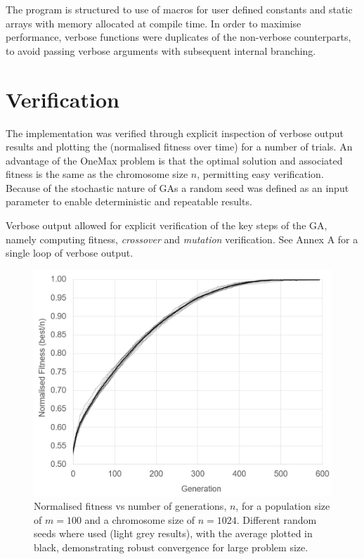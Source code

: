 \documentclass{report}
\begin{document}
The program is structured to use of macros for user defined constants and static arrays with memory allocated at compile time. In order to maximise performance, verbose functions were duplicates of the non-verbose counterparts, to avoid passing verbose arguments with subsequent internal branching. 

\section{Verification}
The implementation was verified through explicit inspection of verbose output results and plotting the (normalised fitness over time) for a number of trials. An advantage of the OneMax problem is that the optimal solution and associated fitness is the same as the chromosome size \(n\), permitting easy verification.  Because of the stochastic nature of GAs a  random seed was defined as an input parameter to enable deterministic and repeatable results.

Verbose output allowed for explicit verification of the key steps of the GA, namely computing fitness, \textit{crossover} and \textit{mutation} verification. See Annex A for a single loop of verbose output.


\begin{figure}[H]
\centering
\includegraphics[scale=0.6]{normfit.png}
\caption{Normalised fitness vs number of generations, \(n\), for a population size of \(m=100\) and a chromosome size of \(n=1024\). Different random seeds where used (light grey results), with the average  plotted in black, demonstrating robust convergence for large problem size.}
\end{figure}
\end{document}
